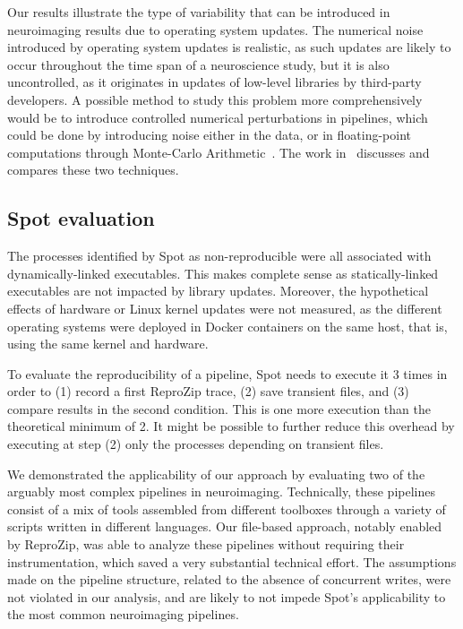 \documentclass[a4paper,num-refs]{oup-contemporary}
\newcommand{\reprozip}[0]{ReproZip\xspace}
\newcommand{\toolname}[0]{Spot\xspace}
\begin{document}
Our results illustrate the type of variability that can be introduced in
 neuroimaging results due to operating system updates. The
 numerical noise introduced by operating system updates is realistic, as
 such updates are likely to occur throughout the time span of a
 neuroscience study, but it is also uncontrolled, as it originates in
 updates of low-level libraries by third-party developers. A possible
 method to study this problem more comprehensively would be to introduce
 controlled numerical perturbations in pipelines, which could be done by
 introducing noise either in the data, or in floating-point computations
 through Monte-Carlo Arithmetic~\cite{Parker1997-qq}. The work
 in~\cite{kiar2019comparing} discusses and compares these two techniques.

\subsection{\toolname evaluation}

The processes identified by \toolname as non-reproducible were all
associated with dynamically-linked executables. 
This makes complete sense as statically-linked executables are not
impacted by library updates. Moreover, the hypothetical effects of
hardware or Linux kernel updates were not measured, as the different
operating systems were deployed in Docker containers on the same host, that
is, using the same kernel and hardware.

To evaluate the reproducibility of a pipeline, \toolname needs to execute
it 3 times in order to (1) record a first \reprozip trace, (2) save
transient files, and (3) compare results in the second condition. This is
one more execution than the theoretical minimum of 2. It might be possible
to further reduce this overhead by executing at step (2) only the
processes depending on transient files.

We demonstrated the applicability of our approach by evaluating two of the
arguably most complex pipelines in neuroimaging. Technically, these
pipelines consist of a mix of tools assembled from different toolboxes
through a variety of scripts written in different languages. Our file-based
approach, notably enabled by \reprozip, was able to analyze these pipelines
without requiring their instrumentation, which saved a very substantial
technical effort. The assumptions made on the pipeline structure, related
to the absence of concurrent writes, were not violated in our analysis, and
are likely to not impede \toolname's applicability to the most common
neuroimaging pipelines.
\end{document}
